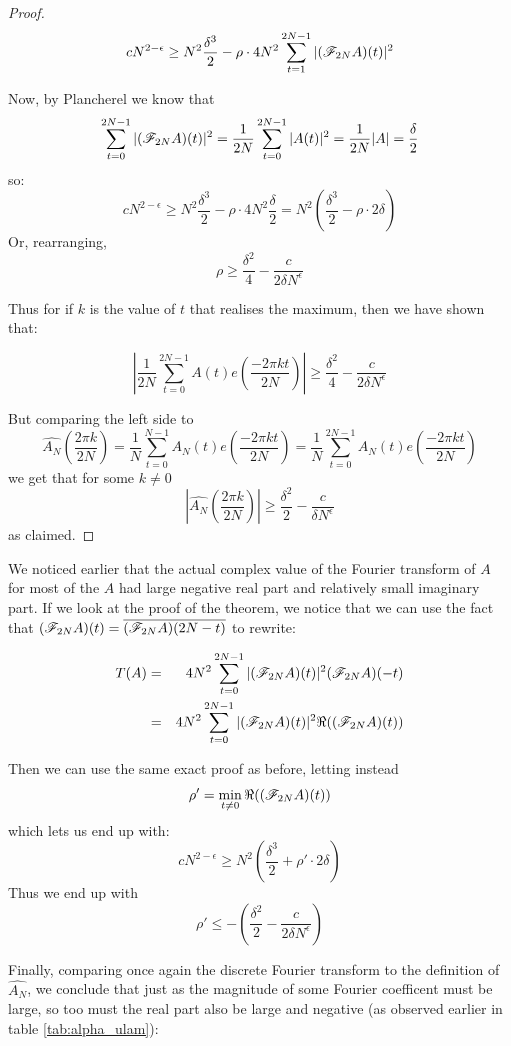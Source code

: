 \documentclass{report}
\theoremstyle{remark}
\numberwithin{equation}{section}
\begin{document}
\begin{proof}
  \[cN^{2-\epsilon} \geq N^2 \frac{\delta^3}{2} - \rho \cdot 4 N^2
    \sum_{t=1}^{2N-1} |(\mathscr{F}_{2N} A)(t)|^2\]

  Now, by Plancherel we know that
  \[\sum_{t=0}^{2N-1} |(\mathscr{F}_{2N}A)(t)|^2 = \frac{1}{2N}
  \sum_{t=0}^{2N-1} |A(t)|^2 = \frac{1}{2N} |A| = \frac{\delta}{2}\]
  so:
  \[cN^{2-\epsilon} \geq N^2 \frac{\delta^3}{2} - \rho \cdot 4N^2
    \frac{\delta}{2} = N^2\left(\frac{\delta^3}{2} - \rho\cdot 2
      \delta \right)\]
  Or, rearranging, 
  \[\rho \geq \frac{\delta^2}{4} - \frac{c}{2\delta N^\epsilon}\]

  Thus for if $k$ is the value of $t$ that realises the maximum, then we
  have shown that: 
  
  \[\left|\frac{1}{2N} \sum_{t=0}^{2N-1} A(t) e(\frac{-2\pi k
        t}{2N})\right| \geq \frac{\delta^2}{4} - \frac{c}{2\delta N^\epsilon}\]
  
  But comparing the left side to 
  \[\widehat{A_N}(\frac{2\pi k}{2N}) = \frac{1}{N}\sum_{t=0}^{N-1} A_N(t) e(\frac{-2\pi k
      t}{2N}) = \frac{1}{N}\sum_{t=0}^{2N-1} A_N(t) e(\frac{-2\pi k
      t}{2N})\]
  we get that for some $k \neq 0$
  \[|\widehat{A_N}(\frac{2\pi k}{2N})| \geq \frac{\delta^2}{2} - \frac{c}{\delta
      N^\epsilon}\]
  as claimed.
\end{proof}

We noticed earlier that the actual complex value of the Fourier
transform of $A$ for most of the $A$ had large negative real part and
relatively small imaginary part.  If we look at the proof of the
theorem, we notice that we can use the fact that
$(\mathscr{F}_{2N}A)(t) = \overline{(\mathscr{F}_{2N}A)(2N-t)}$ to rewrite:

\begin{eqnarray*}
T(A) &=& 4 N^2 \sum_{t=0}^{2N-1} |(\mathscr{F}_{2N}A)(t)|^2(\mathscr{F}_{2N}A)(-t)\\
 &=& 4 N^2 \sum_{t=0}^{2N-1} |(\mathscr{F}_{2N}A)(t)|^2\Re((\mathscr{F}_{2N}A)(t))
\end{eqnarray*}

Then we can use the same exact proof as before, letting instead
\[\rho' = \min_{t \neq 0} \Re((\mathscr{F}_{2N}A)(t))\] which lets us end up with: 
\[cN^{2-\epsilon} \geq N^2\left(\frac{\delta^3}{2} + \rho'\cdot 2 \delta
  \right)\]
Thus we end up with \[\rho' \leq -\left(\frac{\delta^2}{2} -
    \frac{c}{2\delta N^\epsilon}\right)\]

Finally, comparing once again the discrete Fourier transform to the
definition of $\widehat{A_N}$, we conclude that just as the magnitude
of some Fourier coefficent must be large, so too must the real part
also be large and negative (as observed earlier in table
\ref{tab:alpha_ulam}):
\end{document}
